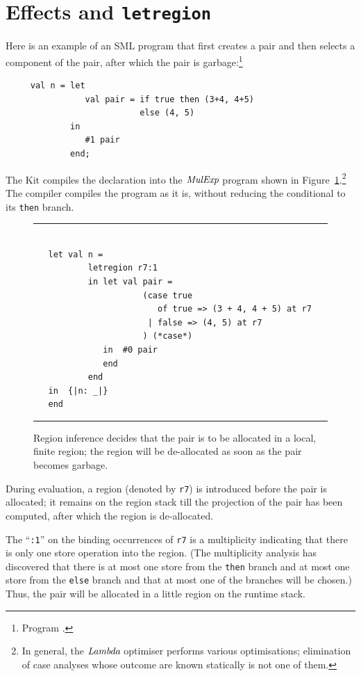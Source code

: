 \documentclass[12pt]{book}
\begin{document}
\section{Effects and {\tt letregion}}
\label{effects.sec}
Here is an example of an SML program that first creates a pair and
then selects a component of the pair, after which the pair is garbage:\footnote{Program .}
\begin{verbatim}
     val n = let 
                val pair = if true then (3+4, 4+5) 
                           else (4, 5)
             in 
                #1 pair
             end;
\end{verbatim}
The Kit compiles the declaration into the 
$\hbox{\it MulExp}$ program shown in Figure~\ref{elimpair.fig}.\footnote{
In general, the $\hbox{\it Lambda}$ optimiser performs various optimisations;
elimination of case analyses whose outcome are known statically
is not one of them.}
The compiler compiles the program as it is, without reducing the conditional
to its {\tt then} branch.
\begin{figure}
\hrule
\begin{verbatim}

   let val n = 
           letregion r7:1 
           in let val pair = 
                      (case true 
                         of true => (3 + 4, 4 + 5) at r7 
                       | false => (4, 5) at r7
                      ) (*case*) 
              in  #0 pair
              end  
           end
   in  {|n: _|}
   end 
\end{verbatim}
\caption{Region inference decides that the 
pair is to be allocated in a local, finite region; the region will be de-allocated
as soon as the pair becomes garbage.}
\medskip

\hrule
\label{elimpair.fig}
\end{figure}
During evaluation, a region (denoted by {\tt r7}) 
is introduced before the pair is allocated;
it remains on the region stack till the projection of the pair
has been computed, after which the region is de-allocated. 

The ``{\tt :1}'' on the binding occurrences of {\tt r7}
is a multiplicity indicating that there is only one store
operation into the region. (The multiplicity analysis
has discovered that there is at most one store from the {\tt then}
branch and at most one store from the {\tt else} branch and that
at most one of the branches will be chosen.) Thus, the pair will be
allocated in a little region on the runtime stack.
\end{document}
